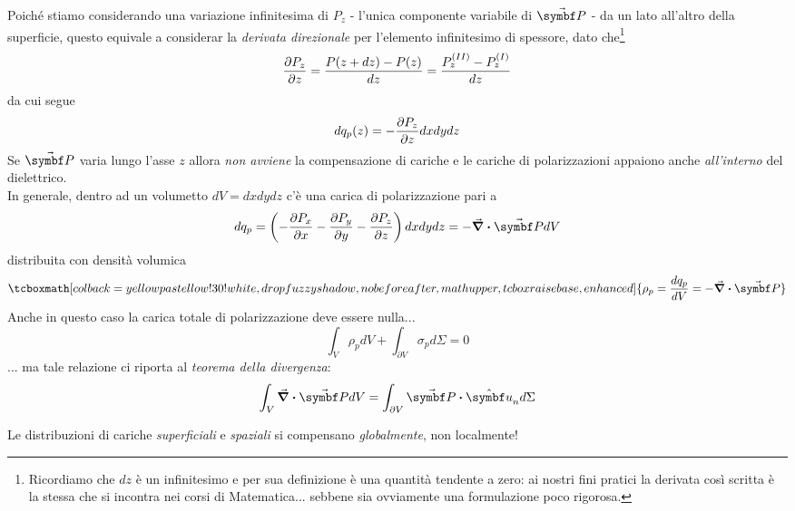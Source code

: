 Poiché stiamo considerando una variazione infinitesima di $P_z$ - l'unica componente variabile di $\vba{P}$ - da un lato all'altro della superficie, questo equivale a considerar la \textit{derivata direzionale} per l'elemento infinitesimo di spessore, dato che\footnote{Ricordiamo che $dz$ è un infinitesimo e per sua definizione è una quantità tendente a zero: ai nostri fini pratici la derivata così scritta è la stessa che si incontra nei corsi di Matematica... sebbene sia ovviamente una formulazione poco rigorosa.}
\begin{equation*}
	\pdv{P_z}{z}=\frac{P(z+d z)-P(z)}{dz}=\frac{P^{(II)}_z-P^{(I)}_z}{dz}
\end{equation*}
da cui segue
\begin{equation*}
	dq_{p}(z)=-\pdv{P_z}{z}dxdydz
\end{equation*}
Se $\vba{P}$ varia lungo l'asse $z$ allora \textit{non avviene} la compensazione di cariche e le cariche di polarizzazioni appaiono anche \textit{all'interno} del dielettrico.\\
In generale, dentro ad un volumetto $dV=dxdydz$ c'è una carica di polarizzazione pari a
\begin{equation*}
	dq_{p}=\left(-\pdv{P_x}{x}-\pdv{P_y}{y}-\pdv{P_z}{z}\right)dxdydz=-\div{\vba{P}}dV
\end{equation*}
distribuita con densità volumica
\begin{equation}
	\tcboxmath[colback=yellowpastellow!30!white,drop fuzzy shadow, nobeforeafter, math upper, tcbox raise base, enhanced]{\rho_p=\frac{dq_{p}}{dV}=-\div{\vba{P}}}
\end{equation}
Anche in questo caso la carica totale di polarizzazione deve essere nulla...
\begin{equation}
	\int_V\rho_p dV+\int_{\partial V}\sigma_p d\Sigma=0
\end{equation}
... ma tale relazione ci riporta al \textit{teorema della divergenza}:
\begin{equation}
	\int_V \div{\vba{P}} dV = \int_{\partial V} \vba{P}\vdot\vbh{u}_nd\Sigma
\end{equation}
\begin{attention}
	Le distribuzioni di cariche \textit{superficiali} e \textit{spaziali} si compensano \textit{globalmente}, non localmente!
\end{attention}
